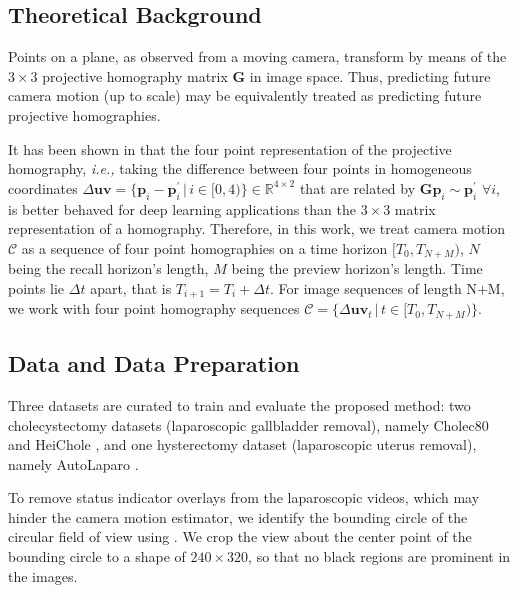 \subsection{Theoretical Background}
\label{c4:sec:theoretical_background}
Points on a plane, as observed from a moving camera, transform by means of the $3\times3$ projective homography matrix $\mathbf{G}$ in image space. Thus, predicting future camera motion (up to scale) may be equivalently treated as predicting future projective homographies.

It has been shown in \cite{DeTone2016DeepEstimation} that the four point representation of the projective homography, \emph{i.e.,}  taking the difference between four points in homogeneous coordinates $\Delta\mathbf{uv} = \{\mathbf{p}_i - \mathbf{p}^\prime_i\,|\,i \in [0, 4)\} \in \mathbb{R}^{4\times2}$ that are related by $\mathbf{G}\mathbf{p}_i \sim \mathbf{p}^\prime_i\,\,\forall i$, is better behaved for deep learning applications than the $3\times3$ matrix representation of a homography.
%
Therefore, in this work, we treat camera motion $\mathcal{C}$ as a sequence of four point homographies on a time horizon $[T_0, T_{N+M})$, $N$ being the recall horizon's length, $M$ being the preview horizon's length. Time points 
lie $\Delta t$ apart, that is $T_{i+1} = T_{i} + \Delta t$. For image sequences of length $\text{N+M}$,
we work with
four point homography sequences $\mathcal{C}=\{\Delta\mathbf{uv}_t \,|\, t\in[T_0, T_{N+M})\}$.



\subsection{Data and Data Preparation}
\label{c4:sec:data_and_data_preparation}
Three datasets are
curated
to train and evaluate the proposed method: two cholecystectomy datasets (laparoscopic gallbladder removal), namely Cholec80 \cite{twinanda2016endonet} and HeiChole \cite{wagner2023comparative}, and one hysterectomy dataset (laparoscopic uterus removal), namely AutoLaparo \cite{wang2022autolaparo}.


To remove status indicator overlays from the laparoscopic videos, which may hinder the camera motion estimator, we identify the bounding circle of the circular field of view using \cite{Budd2022RapidDataset}. We crop the view about the center point of the bounding circle to a shape of $240\times320$, so that no black regions are prominent in the images.

